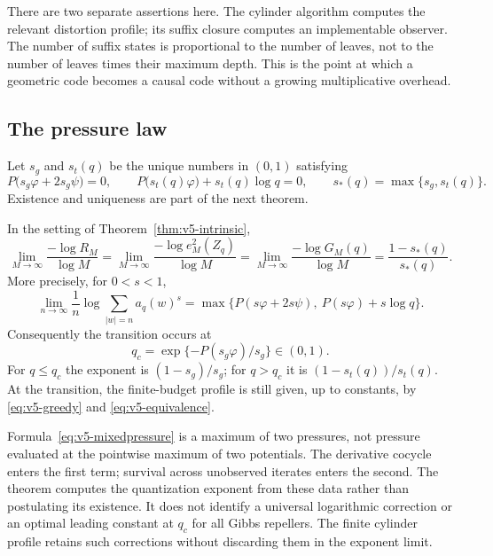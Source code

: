 There are two separate assertions here. The cylinder algorithm
computes the relevant distortion profile; its suffix closure computes
an implementable observer. The number of suffix states is proportional
to the number of leaves, not to the number of leaves times their
maximum depth. This is the point at which a geometric code becomes a
causal code without a growing multiplicative overhead.

\subsection{The pressure law}
Let $s_g$ and $s_t(q)$ be the unique numbers in $(0,1)$ satisfying
\begin{equation}\label{eq:v5-roots}
 P\bigl(s_g\varphi+2s_g\psi\bigr)=0,
 \qquad P\bigl(s_t(q)\varphi\bigr)+s_t(q)\log q=0,
 \qquad s_*(q)=\max\{s_g,s_t(q)\}.
\end{equation}
Existence and uniqueness are part of the next theorem.

\begin{theorem}
\label{thm:v5-pressure}
In the setting of Theorem~\ref{thm:v5-intrinsic},
\begin{equation}\label{eq:v5-exponent}
 \lim_{M\to\infty}\frac{-\log R_M}{\log M}
 =\lim_{M\to\infty}\frac{-\log e_M^2(Z_q)}{\log M}
 =\lim_{M\to\infty}\frac{-\log G_M(q)}{\log M}
 =\frac{1-s_*(q)}{s_*(q)}.
\end{equation}
More precisely, for $0<s<1$,
\begin{equation}\label{eq:v5-mixedpressure}
 \lim_{n\to\infty}\frac1n\log\sum_{|w|=n}a_q(w)^s
 =\max\{P(s\varphi+2s\psi),\ P(s\varphi)+s\log q\}.
\end{equation}
Consequently the transition occurs at
\begin{equation}\label{eq:v5-qcritical}
 q_c=\exp\{-P(s_g\varphi)/s_g\}\in(0,1).
\end{equation}
For $q\le q_c$ the exponent is $(1-s_g)/s_g$; for $q>q_c$ it is
$(1-s_t(q))/s_t(q)$. At the transition, the finite-budget profile is
still given, up to constants, by \eqref{eq:v5-greedy} and
\eqref{eq:v5-equivalence}.
\end{theorem}

Formula~\eqref{eq:v5-mixedpressure} is a maximum of two pressures,
not pressure evaluated at the pointwise maximum of two potentials.
The derivative cocycle enters the first term; survival across
unobserved iterates enters the second. The theorem computes the
quantization exponent from these data rather than postulating its
existence. It does not identify a universal logarithmic correction or
an optimal leading constant at $q_c$ for all Gibbs repellers. The
finite cylinder profile retains such corrections without discarding
them in the exponent limit.

